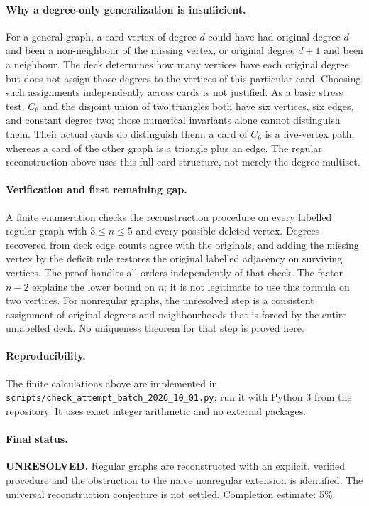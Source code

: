 \documentclass[11pt,a4paper]{article}
\begin{document}
\paragraph{Why a degree-only generalization is insufficient.}
For a general graph, a card vertex of degree $d$ could have had original
degree $d$ and been a non-neighbour of the missing vertex, or original degree
$d+1$ and been a neighbour. The deck determines how many vertices have each
original degree but does not assign those degrees to the vertices of this
particular card. Choosing such assignments independently across cards is not
justified. As a basic stress test, $C_6$ and the disjoint union of two triangles
both have six vertices, six edges, and constant degree two; those numerical
invariants alone cannot distinguish them. Their actual cards do distinguish
them: a card of $C_6$ is a five-vertex path, whereas a card of the other graph
is a triangle plus an edge. The regular reconstruction above uses this full
card structure, not merely the degree multiset.

\paragraph{Verification and first remaining gap.}
A finite enumeration checks the reconstruction procedure on every labelled
regular graph with $3\le n\le5$ and every possible deleted vertex. Degrees
recovered from deck edge counts agree with the originals, and adding the
missing vertex by the deficit rule restores the original labelled adjacency
on surviving vertices. The proof handles all orders independently of that
check. The factor $n-2$ explains the lower bound on $n$; it is not legitimate
to use this formula on two vertices. For nonregular graphs, the unresolved
step is a consistent assignment of original degrees and neighbourhoods that
is forced by the entire unlabelled deck. No uniqueness theorem for that step
is proved here.

\paragraph{Reproducibility.}
The finite calculations above are implemented in
\texttt{scripts/check\_attempt\_batch\_2026\_10\_01.py}; run it with Python 3
from the repository. It uses exact integer arithmetic and no external packages.

\paragraph{Final status.}
\textbf{UNRESOLVED.} Regular graphs are reconstructed with an explicit,
verified procedure and the obstruction to the naive nonregular extension is
identified. The universal reconstruction conjecture is not settled.
Completion estimate: 5\%.
\end{document}
